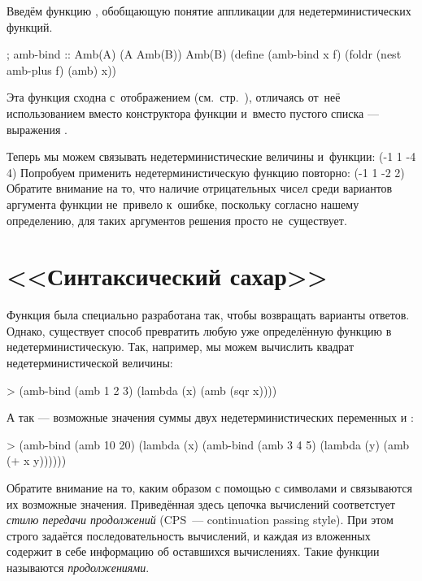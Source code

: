 Введём функцию , обобщающую понятие аппликации для недетерминистических функций.
\begin{Definition}[emph={x,f}]
  ; amb-bind :: Amb(A) (A \arrow Amb(B)) \arrow Amb(B)
  (define (amb-bind x f)
    (foldr (nest amb-plus f) (amb) x))
\end{Definition}
Эта функция сходна с~отображением  (см.~стр.~\pageref{fold:map}), отличаясь от~неё использованием вместо конструктора  функции  и~вместо пустого списка --- выражения .

Теперь мы можем связывать недетерминистические величины и~функции:
     {(-1 1 -4 4)}
Попробуем применить недетерминистическую функцию  повторно:
     {(-1 1 -2 2)}
Обратите внимание на то, что наличие отрицательных чисел среди вариантов аргумента функции  не~привело к~ошибке, поскольку согласно нашему определению, для таких аргументов решения просто не~существует.

\section{<<Синтаксический сахар>>}%
Функция  была специально разработана так, чтобы возвращать варианты ответов. Однако, существует способ превратить любую уже определённую функцию в недетерминистическую. Так, например, мы можем вычислить квадрат недетерминистической величины:
\begin{SchemeCode}[emph={x}]
   > (amb-bind (amb 1 2 3) (lambda (x) (amb (sqr x))))
\end{SchemeCode}\vspace{-\medskipamount}
А так --- возможные значения суммы двух недетерминистических переменных  и :
\begin{SchemeCode}[emph={x,y}]
   > (amb-bind (amb 10 20) 
               (lambda (x) (amb-bind (amb 3 4 5)
                                (lambda (y) (amb (+ x y))))))
\end{SchemeCode}\vspace{-\medskipamount}
Обратите внимание на то, каким образом с помощью  с символами  и  связываются их возможные значения. Приведённая здесь цепочка вычислений соответстует \emph{стилю передачи продолжений} (CPS~--- continuation passing style). При этом строго задаётся последовательность вычислений, и каждая из вложенных  содержит в себе информацию об оставшихся вычислениях. Такие функции называются \emph{продолжениями}.

